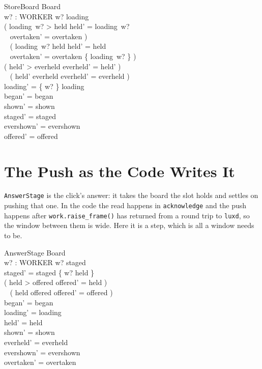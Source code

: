 \documentclass[a4paper,10pt,fleqn]{article}
\begin{document}
\begin{schema}{StoreBoard}
  \Delta Board \\
  w? : WORKER
\where
  w? \in \dom loading \\
  ( loading~w? > held \land held' = loading~w? \\
  \quad~ \land overtaken' = overtaken ) \lor \\
  \quad~ ( loading~w? \leq held \land held' = held \\
  \quad~ \land overtaken' = overtaken \cup \{ loading~w? \} ) \\
  ( held' > everheld \land everheld' = held' ) \lor \\
  \quad~ ( held' \leq everheld \land everheld' = everheld ) \\
  loading' = \{ w? \} \ndres loading \\
  began' = began \\
  shown' = shown \\
  staged' = staged \\
  evershown' = evershown \\
  offered' = offered
\end{schema}

\section{The Push as the Code Writes It}

\texttt{AnswerStage} is the click's answer: it takes the board the slot holds
and settles on pushing that one. In the code the read happens in
\texttt{acknowledge} and the push happens after \texttt{work.raise\_frame()}
has returned from a round trip to \texttt{luxd}, so the window between them is
wide. Here it is a step, which is all a window needs to be.

\begin{schema}{AnswerStage}
  \Delta Board \\
  w? : WORKER
\where
  w? \notin \dom staged \\
  staged' = staged \cup \{ w? \mapsto held \} \\
  ( held > offered \land offered' = held ) \lor \\
  \quad~ ( held \leq offered \land offered' = offered ) \\
  began' = began \\
  loading' = loading \\
  held' = held \\
  shown' = shown \\
  everheld' = everheld \\
  evershown' = evershown \\
  overtaken' = overtaken
\end{schema}
\end{document}
